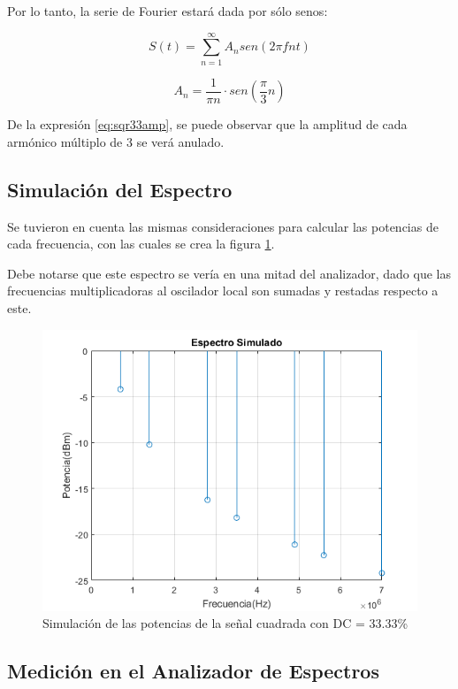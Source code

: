     Por lo tanto, la serie de Fourier estará dada por sólo senos:

    \begin{equation}
        S(t) = \sum_{n=1}^{\infty} A_{n} sen(2 \pi f n t)
        \label{eq:sqr33}
    \end{equation}

    \begin{equation}
        A_{n} =\frac{1}{\pi n} \cdot sen(\frac{\pi}{3}n)
        \label{eq:sqr33amp}
    \end{equation}

    De la expresión	\ref{eq:sqr33amp}, se puede observar que la amplitud de cada armónico
    múltiplo de 3 se verá anulado.
    
    \subsection{Simulación del Espectro}
    Se tuvieron en cuenta las mismas consideraciones para calcular las potencias de cada
    frecuencia, con las cuales se crea la figura \ref{fig:2,3,2}.

    Debe notarse que este espectro se vería en una mitad del analizador,
    dado que las frecuencias multiplicadoras al oscilador local son sumadas
    y restadas respecto a este.

    \begin{figure}[ht]
        \begin{center}
            \includegraphics[width=0.75\linewidth]{contenido/img/spect_sqr33.png}
            \caption{Simulación de las potencias de la señal cuadrada con DC = 33.33\%}
            \label{fig:2,3,2}
        \end{center}
    \end{figure}

    \subsection{Medición en el Analizador de Espectros}

